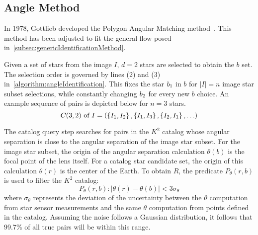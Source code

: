 
\subsection{Angle Method}\label{subsec:angleMethod}
In 1978, Gottlieb developed the Polygon Angular Matching method~\cite{Angle,AnalysisUncompensated}.
This method has been adjusted to fit the general flow posed in~\autoref{subsec:genericIdentificationMethod}.

Given a set of stars from the image $I$, $d = 2$ stars are selected to obtain the $b$ set.
The selection order is governed by lines (2) and (3) in~\autoref{algorithm:angleIdentification}.
This fixes the star $b_1$ in $b$ for $|I| = n$ image star subset selections, while constantly changing
$b_2$ for every new $b$ choice.
An example sequence of pairs is depicted below for $n = 3$ stars.
\begin{equation}
    C(3, 2) \text{ of } I = \left(\left\{ I_1, I_2 \right\}, \left\{ I_1,I_3 \right\}, \left\{ I_2,I_1 \right\},
    \ldots \right)
\end{equation}

The catalog query step searches for pairs in the $K^2$ catalog whose angular separation is close to the angular
separation of the image star subset.
For the image star subset, the origin of the angular separation calculation $\theta(b)$ is the focal point of the lens
itself.
For a catalog star candidate set, the origin of this calculation $\theta(r)$ is the center of the Earth.
To obtain $R$, the predicate $P_\theta(r, b)$ is used to filter the $K^2$ catalog:
\begin{equation}\label{eq:angleRequirement}
    P_{\theta}(r, b) : \left\lvert \theta(r) - \theta(b)\right\rvert < 3 \sigma_\theta
\end{equation}
where $\sigma_{\theta}$ represents the deviation of the uncertainty between the $\theta$ computation from star sensor
measurements and the same $\theta$ computation from points defined in the catalog.
Assuming the noise follows a Gaussian distribution, it follows that 99.7\% of all true pairs will be within this range.


